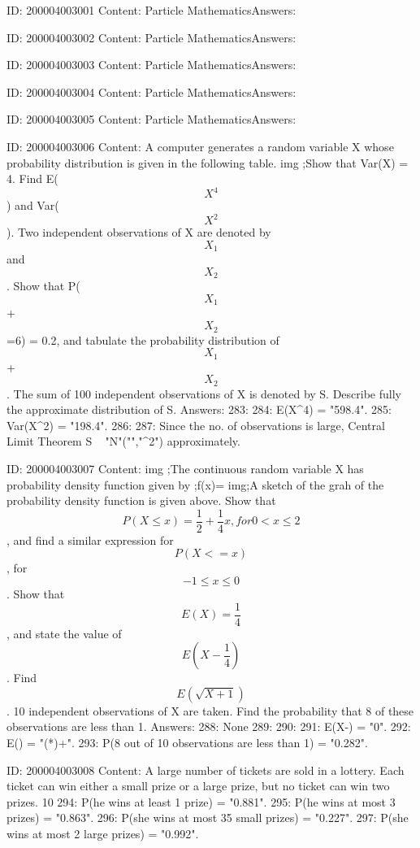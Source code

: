 \documentclass{article}
\begin{document}
ID: 200004003001
Content:
Particle MathematicsAnswers:

ID: 200004003002
Content:
Particle MathematicsAnswers:

ID: 200004003003
Content:
Particle MathematicsAnswers:

ID: 200004003004
Content:
Particle MathematicsAnswers:

ID: 200004003005
Content:
Particle MathematicsAnswers:

ID: 200004003006
Content:
A computer generates a random variable X whose probability distribution is given in the following table. img ;Show that Var(X) = 4. Find E($$X^4$$) and Var($$X^2$$). Two independent observations of X are denoted by $$X_1$$ and $$X_2$$. Show that P($$X_1$$+$$X_2$$ =6) = 0.2, and tabulate the probability distribution of $$X_1$$+ $$X_2$$. The sum of 100 independent observations of X is denoted by S. Describe fully the approximate distribution of S.  Answers:
283: 
284: E(X^4) = "598.4".
285: Var(X^2) = "198.4".
286: 
287: Since the no. of observations is large, Central Limit Theorem \Rightarrow S ~ "N"("\mu","\sigma^{2}") approximately.

ID: 200004003007
Content:
img ;The continuous random variable X has probability density function given by ;f(x)= img;A sketch of the grah of the probability density function is given above. Show that $$P(X \leq x) = \frac{1}{2} + \frac{1}{4}x, for 0 < x \leq 2$$, and find a similar expression for $$P(X<=x)$$, for $$-1 \leq x \leq 0$$. Show that $$E(X) = \frac{1}{4}$$, and state the value of $$E(X - \frac{1}{4})$$. Find $$E(\sqrt{X+1})$$. 10 independent observations of X are taken. Find the probability that 8 of these observations are less than 1. Answers:
288: None
289: 
290: 
291: E(X-) = "0".
292: E() = "(*)+".
293: P(8 out of 10 observations are less than 1) = "0.282".

ID: 200004003008
Content:
A large number of tickets are sold in a lottery. Each ticket can win either a small prize or a large prize, but no ticket can win two prizes. 10%
294: P(he wins at least 1 prize) = "0.881".
295: P(he wins at most 3 prizes) = "0.863".
296: P(she wins at most 35 small prizes) = "0.227".
297: P(she wins at most 2 large prizes) = "0.992".
\end{document}
